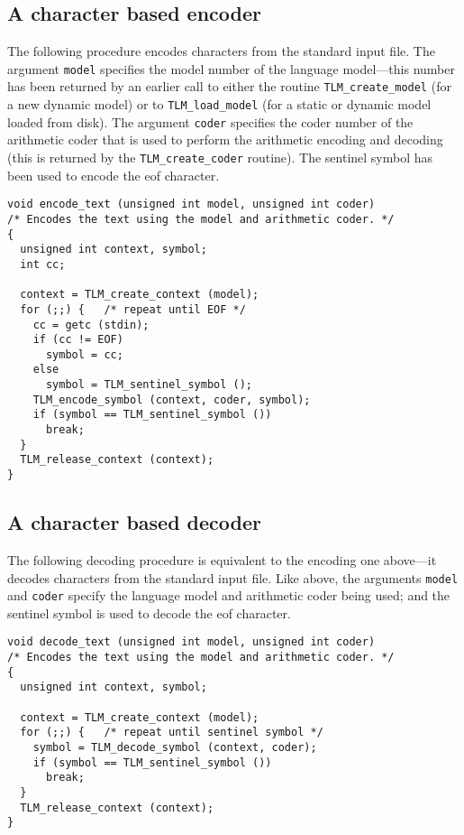 \documentclass[11pt]{article}
\begin{document}
\subsection{A character based encoder}

The following procedure encodes characters from the standard input file.
The argument \verb|model| specifies the model number of the language model---this number has been returned
by an earlier call to either the routine \verb|TLM_create_model| (for a new dynamic model)
or to \verb|TLM_load_model| (for a static or dynamic model loaded from disk).
The argument \verb|coder| specifies the coder number of the arithmetic coder
that is used to perform the arithmetic encoding and decoding (this is returned
by the \verb|TLM_create_coder| routine).
The sentinel symbol has been used to encode the eof character.
 
\begin{verbatim}
void encode_text (unsigned int model, unsigned int coder)
/* Encodes the text using the model and arithmetic coder. */
{
  unsigned int context, symbol;
  int cc;

  context = TLM_create_context (model);
  for (;;) {   /* repeat until EOF */
    cc = getc (stdin);
    if (cc != EOF)
      symbol = cc;
    else
      symbol = TLM_sentinel_symbol ();
    TLM_encode_symbol (context, coder, symbol);
    if (symbol == TLM_sentinel_symbol ())
      break;
  }
  TLM_release_context (context);
}
\end{verbatim}

\subsection{A character based decoder}

The following decoding procedure is equivalent to the encoding one above---it
decodes characters from the standard input file. Like above, the
arguments \verb|model| and \verb|coder| specify the language model and
arithmetic coder being used; and the sentinel symbol is used to decode
the eof character.
 
\begin{verbatim}
void decode_text (unsigned int model, unsigned int coder)
/* Encodes the text using the model and arithmetic coder. */
{
  unsigned int context, symbol;

  context = TLM_create_context (model);
  for (;;) {   /* repeat until sentinel symbol */
    symbol = TLM_decode_symbol (context, coder);
    if (symbol == TLM_sentinel_symbol ())
      break;
  }
  TLM_release_context (context);
}
\end{verbatim}
\end{document}
